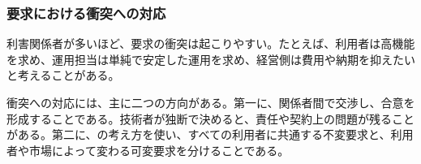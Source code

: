 \subsubsection{要求における衝突への対応}

利害関係者が多いほど、要求の衝突は起こりやすい。たとえば、利用者は高機能を求め、運用担当は単純で安定した運用を求め、経営側は費用や納期を抑えたいと考えることがある。

衝突への対応には、主に二つの方向がある。第一に、関係者間で交渉し、合意を形成することである。技術者が独断で決めると、責任や契約上の問題が残ることがある。第二に、の考え方を使い、すべての利用者に共通する不変要求と、利用者や市場によって変わる可変要求を分けることである。

